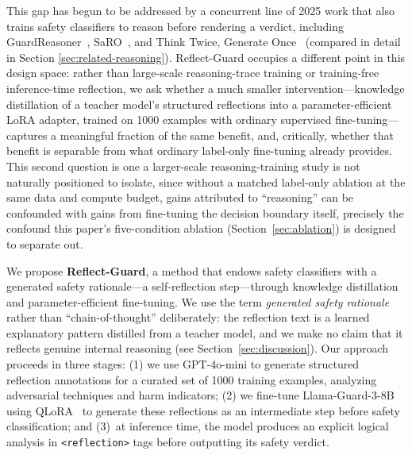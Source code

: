 \documentclass[superintelligence,article,accept,moreauthors]{Definitions/mdpi}
\renewcommand{\hl}[1]{#1}
\begin{document}
This gap has begun to be addressed by a concurrent line of 2025 work that also trains safety classifiers to reason before rendering a verdict, including GuardReasoner~\citep{liu2025guardreasoner}, SaRO~\citep{mou2025saro}, and Think Twice, Generate Once~\citep{phan2025thinktwice} (compared in detail in \hl{Section} %
 \ref{sec:related-reasoning}). Reflect-Guard occupies a different point in this design space: rather than large-scale reasoning-trace training or training-free inference-time reflection, we ask whether a much smaller intervention---knowledge distillation of a teacher model's structured reflections into a parameter-efficient LoRA adapter, trained on 1000 examples with ordinary supervised fine-tuning---captures a meaningful fraction of the same benefit, and, critically, whether that benefit is separable from what ordinary label-only fine-tuning already provides. This second question is one a larger-scale reasoning-training study is not naturally positioned to isolate, since without a matched label-only ablation at the same data and compute budget, gains attributed to ``reasoning'' can be confounded with gains from fine-tuning the decision boundary itself, precisely the confound this paper's five-condition ablation (Section~\ref{sec:ablation}) is designed to separate out.

We propose \textbf{Reflect-Guard}, a method that endows safety classifiers with a generated safety rationale---a self-reflection step---through knowledge distillation and parameter-efficient fine-tuning. We use the term \emph{\hl{generated safety rationale} %
} rather than ``chain-of-thought'' deliberately: the reflection text is a learned explanatory pattern distilled from a teacher model, and we make no claim that it reflects genuine internal reasoning (see Section~\ref{sec:discussion}). Our approach proceeds in three stages: (1) we use GPT-4o-mini to generate structured reflection annotations for a curated set of 1000 training examples, analyzing adversarial techniques and harm indicators; (2) we fine-tune Llama-Guard-3-8B using QLoRA~\citep{dettmers2024qlora} to generate these reflections as an intermediate step before safety classification; and (3)~at inference time, the model produces an explicit logical analysis in \hl{\texttt{<reflection>} %
} tags before outputting its safety verdict.
\end{document}
